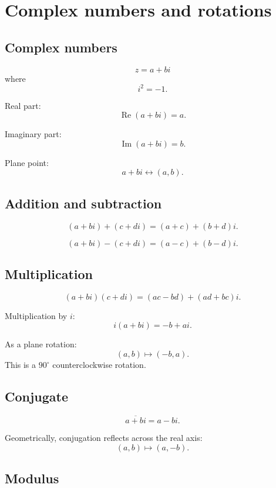 \section{Complex numbers and rotations}
\label{app:B.3}

\subsection*{Complex numbers}

\[
\boxed{
    z=a+bi
}
\]
where
\[
\boxed{
    i^2=-1.
}
\]

Real part:
\[
\boxed{
    \operatorname{Re}(a+bi)=a.
}
\]

Imaginary part:
\[
\boxed{
    \operatorname{Im}(a+bi)=b.
}
\]

Plane point:
\[
\boxed{
    a+bi
    \longleftrightarrow
    (a,b).
}
\]

\subsection*{Addition and subtraction}

\[
\boxed{
    (a+bi)+(c+di)=(a+c)+(b+d)i.
}
\]

\[
\boxed{
    (a+bi)-(c+di)=(a-c)+(b-d)i.
}
\]

\subsection*{Multiplication}

\[
\boxed{
    (a+bi)(c+di)=(ac-bd)+(ad+bc)i.
}
\]

Multiplication by \(i\):
\[
\boxed{
    i(a+bi)=-b+ai.
}
\]

As a plane rotation:
\[
\boxed{
    (a,b)\mapsto(-b,a).
}
\]
This is a \(90^\circ\) counterclockwise rotation.

\subsection*{Conjugate}

\[
\boxed{
    \overline{a+bi}=a-bi.
}
\]

Geometrically, conjugation reflects across the real axis:
\[
    (a,b)\mapsto(a,-b).
\]

\subsection*{Modulus}

